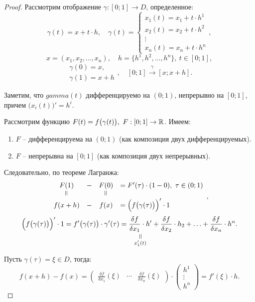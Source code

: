 \begin{proof}
    Рассмотрим отображение $ \gamma:[0;1]\rightarrow D $, определенное:
    \[
        \gamma(t) = x + t\cdot h, \quad \gamma(t) = \left\{\begin{array}{l}
            x_1(t) = x_1 + t\cdot h^1 \\
            x_2(t) = x_2 + t\cdot h^2 \\
            \vdots                    \\
            x_n(t) = x_n + t\cdot h^n
        \end{array}\right.,
    \]
    \[
        x = (x_1,x_2,\ldots,x_n),\quad h = \{h^1,h^2,\ldots,h^n\}, \ t\in [0;1],
    \]
    \[
        \begin{array}{l}
            \gamma(0) = x, \\
            \gamma(1) = x+h
        \end{array}, \quad [0;1]\overset{\gamma}{\longrightarrow}[x;x+h].
    \]

    Заметим, что $ gamma(t) $ дифференцируемо на $ (0;1) $, непрерывно на $ [0;1] $, причем $ \big(x_i(t)\big)' = h^i $.

    Рассмотрим функцию $ F(t) = f\big(\gamma(t)\big), \ F:[0;1]\rightarrow\mathbb{R} $. Имеем:
    \begin{enumerate}
        \item $ F $ -- дифференцируема на $ (0;1) $ (как композиция двух дифференцируемых).
        \item $ F $ -- непрерывна на $ [0;1] $ (как композиция двух непрерывных).
    \end{enumerate}

    Следовательно, по теореме Лагранжа:
    \[
        \begin{array}{cccl}
            F(1)    & - & F(0)    & = F'(\tau)\cdot(1-0), \ \tau \in (0;1)       \\
            \verteq &   & \verteq &                                              \\
            f(x+h)  & - & f(x)    & = \Big(f\big(\gamma(\tau)\big)\Big)' \cdot 1
        \end{array},
    \]
    \[
        \Big(f\big(\gamma(\tau)\big)\Big)' \cdot 1 = f'\big(\gamma(\tau)\big) \cdot \gamma'(\tau) = \equalto{\frac{\delta f}{\delta x_1} \cdot h'}{x_1'(t)} + \frac{\delta f}{\delta x_2}\cdot h_2 + \ldots + \frac{\delta f}{\delta x_n} \cdot h^n.
    \]

    Пусть $ \gamma(\tau) = \xi \in D $, тогда:
    \[
        f(x+h) - f(x) = \left(\begin{matrix}
                \frac{\delta f}{\delta x_1}(\xi) & \cdots & \frac{\delta f}{\delta x_n}(\xi)
            \end{matrix}\right) \cdot \left(\begin{matrix}
                h^1 \\ \vdots \\ h^n
            \end{matrix}\right) = f'(\xi)\cdot h.
    \]
\end{proof}

